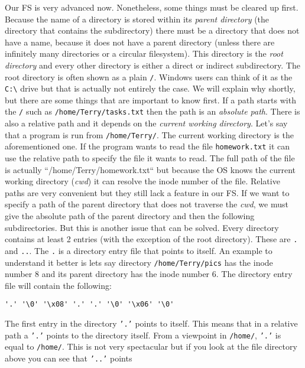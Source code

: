 Our FS is very advanced now. Nonetheless, some things must be cleared up first. Because the name of
a directory is stored within its \textit{parent directory} (the directory that contains the subdirectory)
there must be a directory that does not have a name, because it does not have a parent directory
(unless there are infinitely many directories or a circular filesystem). This directory is the \textit{root
directory} and every other directory is either a direct or indirect subdirectory. The root directory
is often shown as a plain \texttt{/}. Windows users can think of it as the \texttt{C:\textbackslash} drive but that is actually not
entirely the case. We will explain why shortly, but there are some things that are important to know
first. If a path starts with the \texttt{/} such as \texttt{/home/Terry/tasks.txt} then the path is an \textit{absolute
path}. There is also a relative path and it depends on the \textit{current working directory}. Let's say that
a program is run from \texttt{/home/Terry/}. The current working directory is the aforementioned one. If the 
program wants to read the file \texttt{homework.txt} it can use the relative path to specify the file it
wants to read. The full path of the file is actually “/home/Terry/homework.txt“ but because the OS
knows the current working directory (\textit{cwd}) it can resolve the inode number of the file. Relative paths
are very convenient but they still lack a feature in our FS. If we want to specify a path of the parent
directory that does not traverse the \textit{cwd}, we must give the absolute path of the parent directory and
then the following subdirectories. But this is another issue that can be solved. Every directory
contains at least 2 entries (with the exception of the root directory). These are \texttt{.} and \texttt{..}. The
\texttt{.} is a directory entry file that points to itself. An example to understand it better is lets say
directory \texttt{/home/Terry/pics} has the inode number 8 and its parent directory has the inode number 6.
The directory entry file will contain the following:
\newline
\center
\begin{lstlisting}
'.' '\0' '\x08' '.' '.' '\0' '\x06' '\0'
\end{lstlisting}
\raggedright
The first entry in the directory \texttt{'.'} points to itself. This means that in a relative path a \texttt{'.'}
points to the directory itself. From a viewpoint in \texttt{/home/}, \texttt{'.'} is equal to \texttt{/home/}.
This is not very spectacular but if you look at the file directory above you can see that \texttt{'..'} points

